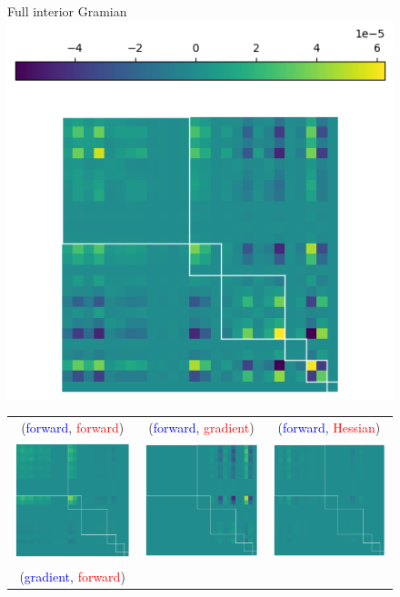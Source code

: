 \begin{figure}[t]
  \centering
  Full interior Gramian\\
  \includegraphics[width=0.43\linewidth]{../kfac_pinns_exp/exp04_gramian_contributions/fig/gram_full.png}

  \begin{tabular}{ccc}
    (\textcolor{blue}{forward}, \textcolor{red}{forward})
    &
      (\textcolor{blue}{forward}, \textcolor{red}{gradient})
    &
      (\textcolor{blue}{forward}, \textcolor{red}{Hessian})
    \\
    \includegraphics[width=0.22\linewidth]{../kfac_pinns_exp/exp04_gramian_contributions/fig/gram_output_output.png}
    &
      \includegraphics[width=0.22\linewidth]{../kfac_pinns_exp/exp04_gramian_contributions/fig/gram_output_grad_input.png}
    &
      \includegraphics[width=0.22\linewidth]{../kfac_pinns_exp/exp04_gramian_contributions/fig/gram_output_hess_input.png}
    \\
    (\textcolor{blue}{gradient}, \textcolor{red}{forward})

\end{tabular}
\end{figure}
